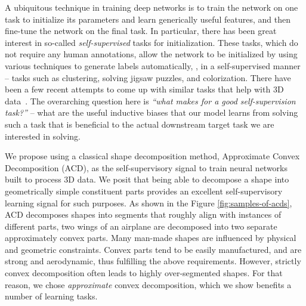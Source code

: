 %
A ubiquitous technique in training deep networks is to train the
network on one task to initialize its parameters and learn generically
useful features, and then fine-tune the network on the final
task. In particular, there has been great interest in so-called {\em
  self-supervised} tasks for initialization. These tasks, which do not
require any human annotations, allow the network to be initialized by
using various techniques to generate labels automatically, \ie, in a
self-supervised manner -- \eg tasks such as clustering, solving jigsaw
puzzles, and colorization. 
There have been
a few recent attempts to come up with similar tasks that help with 3D
data~\cite{hassani2019unsupervised,chen2019bae}.  The overarching question
here is \textit{``what makes for a good self-supervision task?''} --
what are the useful inductive biases that our model learns from
solving such a task that is beneficial to the actual downstream target
task we are interested in solving.  

We propose using a classical shape decomposition method, Approximate Convex Decomposition (ACD), as the
self-supervisory signal to train neural networks built to process 3D
data. We posit that being able to decompose a shape into geometrically
simple constituent parts provides an excellent self-supervisory learning
signal for such purposes. As shown in the Figure
\ref{fig:samples-of-acds}, ACD decomposes shapes into segments that
roughly align with instances of different parts, \eg two wings
of an airplane are decomposed into two separate approximately convex
parts. Many man-made shapes are influenced by physical and geometric 
constraints. 
Convex parts tend to be easily manufactured, and are strong and aerodynamic, thus fulfilling the above
requirements. 
However, strictly convex decomposition often leads to highly
over-segmented shapes.  
For that reason, we chose \textit{approximate}
convex decomposition, which we show benefits a number
of learning tasks.

